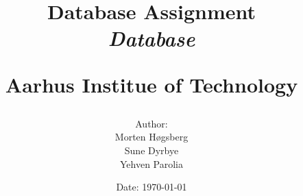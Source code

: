 \newcommand{\authorName}{}
\newcommand{\titleName}{Database Assignment}
\newcommand{\subject}{Database}
\newcommand{\institute}{Aarhus Institue of Technology}
\begin{titlepage}
  \centering
    \title
    {
      \Huge \textbf{\titleName}\\
      \scale{\numberSQRTTWO}{\vspace{\sol pt}}
      \LARGE \textit{\subject}
      \scale{\numberSQRTTWO}{\rule{\linewidth}{\sol pt}}

      \textbf{\institute}
      \author
    {
      \LARGE Author: \textit{\authorName} \\
      Morten Høgsberg \\
      Sune Dyrbye \\
      Yehven Parolia
    }
      \date{\LARGE Date: \today}
    }
\end{titlepage}
